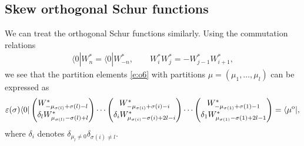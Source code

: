 \documentclass[pdftex]{sigma}
\numberwithin{equation}{section}
\begin{document}
\subsection{Skew orthogonal Schur functions} We can treat the orthogonal Schur functions similarly. Using the commutation relations
\begin{align*}
\langle 0|W^*_n=\langle 0|W^*_{-n},\qquad W^*_iW^*_j=-W^*_{j-1}W^*_{i+1},
\end{align*}
we see that the partition elements \eqref{e:o6} with partitions $\mu=(\mu_1,\dots,\mu_l)$ can be expressed as
\begin{gather}\label{e:o9}
\varepsilon(\sigma)\langle 0|\begin{pmatrix}{W^*_{-\mu_{\sigma(l)}+\sigma(l)-l}}\\{\delta_lW^*_{\mu_{\sigma(l)}-\sigma(l)+l}}\end{pmatrix}\cdots \begin{pmatrix}{W^*_{-\mu_{\sigma(i)}+\sigma(i)-i}}\\{\delta_iW^*_{\mu_{\sigma(i)}-\sigma(i)+2l-i}}\end{pmatrix}\cdots \begin{pmatrix}{W^*_{-\mu_{\sigma(1)}+\sigma(1)-1}}\\{\delta_1W^*_{\mu_{\sigma(1)}-\sigma(1)+2l-1}}\end{pmatrix}=\langle\mu^{\rm o}|,
\end{gather}
where $\delta_i$ denotes $\delta_{\mu_l\neq 0}\delta_{\sigma(i)\neq l}$.
\end{document}
